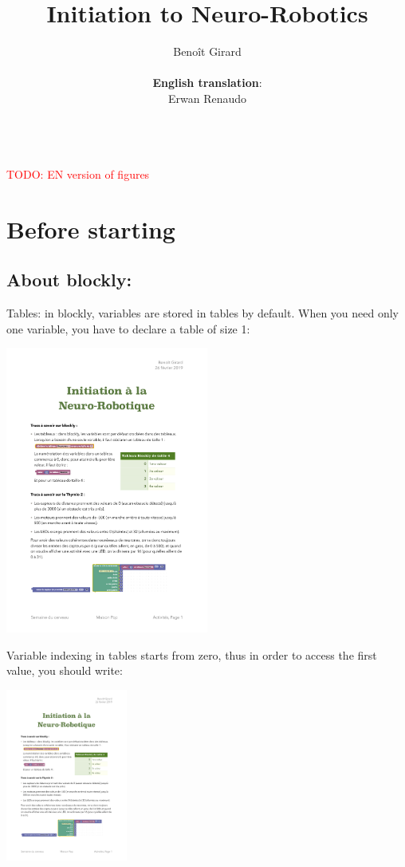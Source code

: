 \documentclass[12pt]{article}
\title{Initiation to Neuro-Robotics}
\author{Beno\^{i}t Girard\\\\\textbf{English translation}:\\ Erwan Renaudo}
\date{}
\begin{document}
\maketitle

\tableofcontents


~\\
\textcolor{red}{TODO: EN version of figures}

\section*{Before starting}
\subsection*{About blockly:}

Tables: in blockly, variables are stored in tables by default. When you need only one variable, you have to declare a table of size 1:

\begin{center}
\includegraphics[width=0.5\textwidth]{../DeclarationTableau.pdf}
\end{center}

Variable indexing in tables starts from zero, thus in order to access the first value, you should write:

\begin{center}
\includegraphics[width=0.3\textwidth]{../AccesTableau.pdf}
\end{center}
\end{document}
